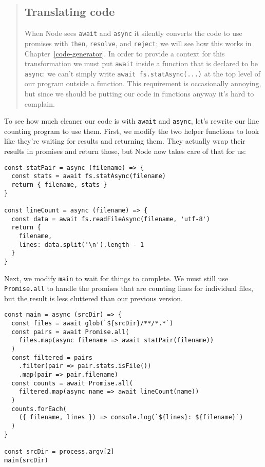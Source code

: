 \documentclass[krantzl]{krantz}
\newcommand{\chapref}[1]{Chapter~\ref{#1}}
\begin{document}
\begin{quotation}

\subsection*{Translating code}


When Node sees \texttt{await} and \texttt{async}
it silently converts the code to use promises with \texttt{then}, \texttt{resolve}, and \texttt{reject};
we will see how this works in \chapref{code-generator}.
In order to provide a context for this transformation
we must put \texttt{await} inside a function that is declared to be \texttt{async}:
we can’t simply write \texttt{await fs.statAsync(...)} at the top level of our program
outside a function.
This requirement is occasionally annoying,
but since we should be putting our code in functions anyway
it’s hard to complain.

\end{quotation}


To see how much cleaner our code is with \texttt{await} and \texttt{async},
let’s rewrite our line counting program to use them.
First,
we modify the two helper functions to look like they’re waiting for results and returning them.
They actually wrap their results in promises and return those,
but Node now takes care of that for us:


\begin{lstlisting}[frame=tblr]
const statPair = async (filename) => {
  const stats = await fs.statAsync(filename)
  return { filename, stats }
}

const lineCount = async (filename) => {
  const data = await fs.readFileAsync(filename, 'utf-8')
  return {
    filename,
    lines: data.split('\n').length - 1
  }
}
\end{lstlisting}



Next,
we modify \texttt{main} to wait for things to complete.
We must still use \texttt{Promise.all} to handle the promises
that are counting lines for individual files,
but the result is less cluttered than our previous version.


\begin{lstlisting}[frame=tblr]
const main = async (srcDir) => {
  const files = await glob(`${srcDir}/**/*.*`)
  const pairs = await Promise.all(
    files.map(async filename => await statPair(filename))
  )
  const filtered = pairs
    .filter(pair => pair.stats.isFile())
    .map(pair => pair.filename)
  const counts = await Promise.all(
    filtered.map(async name => await lineCount(name))
  )
  counts.forEach(
    ({ filename, lines }) => console.log(`${lines}: ${filename}`)
  )
}

const srcDir = process.argv[2]
main(srcDir)
\end{lstlisting}
\end{document}
